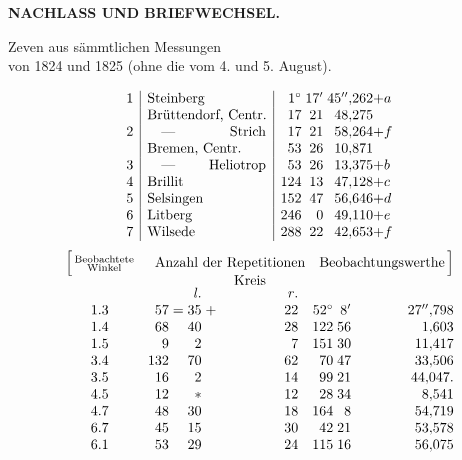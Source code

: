 \par\clearpage
\null\thispagestyle{empty}

\par\clearpage
\thispagestyle{empty}
\vspace*{2.8\baselineskip}
{\centering\Large\bfseries NACHLASS UND BRIEFWECHSEL.\par}
\vspace{3.3\baselineskip}
{\centering
[1.]\par{} Zeven aus sämmtlichen Messungen\\
von 1824 und 1825 (ohne die vom 4. und 5. August).\par{}\par}
\[
\begin{array}{@{}r|l|r@{\;}r@{\;}r@{}l@{}}
 1&\text{Steinberg}&1^\circ&17'&45''{,}262&+a\\
 &\text{Brüttendorf, Centr.}&17&21&48{,}275&\\
 2&\text{\hbox to 8.5em{\quad—\hfil Strich}}&17&21&58{,}264&+f\\
 &\text{Bremen, Centr.}&53&26&10{,}871&\\
 3&\text{\hbox to 8.5em{\quad—\hfil Heliotrop}}&53&26&13{,}375&+b\\
 4&\text{Brillit}&124&13&47{,}128&+c\\
 5&\text{Selsingen}&152&47&56{,}646&+d\\
 6&\text{Litberg}&246&0&49{,}110&+e\\
 7&\text{Wilsede}&288&22&42{,}653&+f
\end{array}
\]
{\small
\[
\begin{array}{@{}c@{\quad}r@{\;}c@{\;}r@{\;}c@{\;}r@{\quad}r@{\;}r@{\;}r@{}}
 \Bigl[\,\substack{\text{Beobachtete}\\\text{Winkel}}&
 \multicolumn{5}{c}{\text{Anzahl der Repetitionen}}&
 \multicolumn{3}{c@{}}{\text{Beobachtungswerthe}\,\Bigr]}\\[-2pt]
 &&&\multicolumn{3}{c}{\text{Kreis}}&&&\\[-3pt]
 &&&\mathit{l.}&&\mathit{r.}&&&\\
 1.3&57&=&35&+&22&52^\circ&8'&27''{,}798\\
 1.4&68&&40&&28&122&56&1{,}603\\
 1.5&9&&2&&7&151&30&11{,}417\\
 3.4&132&&70&&62&70&47&33{,}506\\
 3.5&16&&2&&14&99&21&44{,}047.\\
 4.5&12&&\ast&&12&28&34&8{,}541\\
 4.7&48&&30&&18&164&8&54{,}719\\
 6.7&45&&15&&30&42&21&53{,}578\\
 6.1&53&&29&&24&115&16&56{,}075
\end{array}
\]
}

